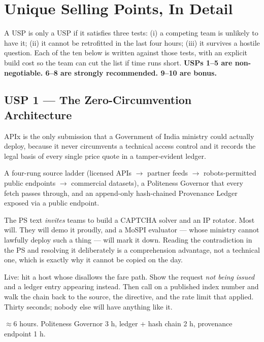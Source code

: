\chapter{Unique Selling Points, In Detail}

A USP is only a USP if it satisfies three tests: (i) a competing team is unlikely to have
it; (ii) it cannot be retrofitted in the last four hours; (iii) it survives a hostile
question. Each of the ten below is written against those tests, with an explicit build cost
so the team can cut the list if time runs short. \textbf{USPs 1--5 are non-negotiable.
6--8 are strongly recommended. 9--10 are bonus.}

\section{USP 1 --- The Zero-Circumvention Architecture}

\begin{uspbox}
 APIx is the only submission that a Government of India ministry could
actually deploy, because it never circumvents a technical access control and it records the
legal basis of every single price quote in a tamper-evident ledger.
\end{uspbox}

 A four-rung source ladder (licensed APIs $\to$ partner feeds $\to$
robots-permitted public endpoints $\to$ commercial datasets), a Politeness Governor that
every fetch passes through, and an append-only hash-chained Provenance Ledger exposed via a
public  endpoint.

 The PS text \emph{invites} teams to build a CAPTCHA
solver and an IP rotator. Most will. They will demo it proudly, and a MoSPI evaluator ---
whose ministry cannot lawfully deploy such a thing --- will mark it down. Reading the
contradiction in the PS and resolving it deliberately is a comprehension advantage, not a
technical one, which is exactly why it cannot be copied on the day.

 Live: hit a host whose  disallows the fare path.
Show the request \emph{not being issued} and a  ledger entry appearing
instead. Then call  on a published index number and walk the chain
back to the source, the directive, and the rate limit that applied. Thirty seconds; nobody
else will have anything like it.

 $\approx$6 hours. Politeness Governor 3 h, ledger + hash chain 2 h,
provenance endpoint 1 h.

